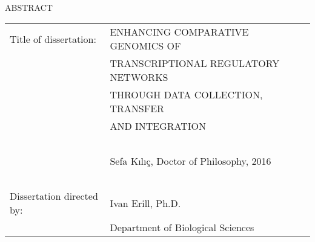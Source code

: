 
\hbox{\ }

\renewcommand{\baselinestretch}{1}
\small \normalsize

\begin{center}
\large{{ABSTRACT}}

\vspace{3em}

\end{center}
\hspace{-.15in}
\begin{tabular}{ll}
Title of dissertation:    & {ENHANCING COMPARATIVE GENOMICS OF}\\
&				      {TRANSCRIPTIONAL REGULATORY NETWORKS} \\
&				      {THROUGH DATA COLLECTION, TRANSFER}\\
&                     {AND INTEGRATION} \\
\ \\
&                          {Sefa Kılıç, Doctor of Philosophy, 2016} \\
\ \\
Dissertation directed by: & {Ivan Erill, Ph.D.} \\
&  				{Department of Biological Sciences } \\
\end{tabular}

\vspace{3em}

\renewcommand{\baselinestretch}{2}
\large \normalsize

